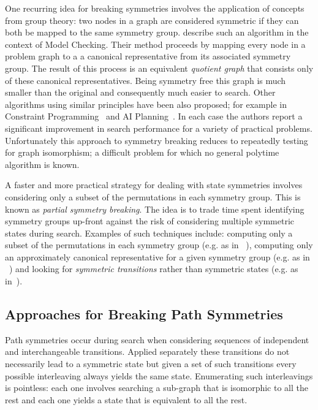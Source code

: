 One recurring idea for breaking symmetries involves the application of concepts from
group theory: two nodes in a graph are considered symmetric if they can both be mapped
to the same symmetry group. \cite{emerson96} describe such an algorithm in the context
of Model Checking. Their method proceeds by mapping every node in a problem graph to a
a canonical representative from its associated symmetry group. The result of this process
is an equivalent \emph{quotient graph} that consists only of these canonical representatives. 
Being symmetry free this graph is much smaller than the original and consequently much 
easier to search. Other algorithms using similar principles have been also proposed; for example
in Constraint Programming~\citep{crawford96,roney-dougal04} and AI Planning~\citep{pochter11}. 
In each case the authors report a significant improvement in search performance for a variety 
of practical problems.
Unfortunately this approach to symmetry breaking reduces to repeatedly testing for graph
isomorphism; a difficult problem for which no general polytime algorithm is known.

A faster and more practical strategy for dealing with state symmetries involves considering 
only a subset of the permutations in each symmetry group. This is known as 
\emph{partial symmetry breaking}. The idea is to trade time spent identifying symmetry 
groups up-front against the risk of considering multiple symmetric states during search.
Examples of such techniques include: computing only a subset of the permutations in each 
symmetry group (e.g. as in ~\citep{crawford96}), computing only an approximately canonical 
representative for a given symmetry group (e.g. as in ~\citep{pochter11}) and looking for 
\emph{symmetric transitions} rather than symmetric states 
(e.g. as in~\citep{fox99,fox02,rintannen03}).

\subsection{Approaches for Breaking Path Symmetries}
\label{cha::lit::symmetry::path}
Path symmetries occur during search when considering sequences of independent and interchangeable
transitions. Applied separately these transitions do not necessarily lead to a symmetric state but
given a set of such transitions every possible interleaving always yields the same state. 
Enumerating such interleavings is pointless: each one involves searching a sub-graph that is 
isomorphic to all the rest and each one yields a state that is equivalent to all the rest.

